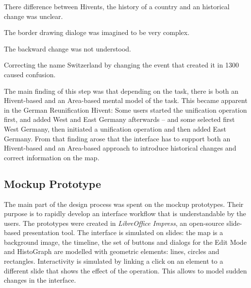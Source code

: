 \begin{compactenum}
  \item There difference between Hivents, the history of a country and an historical change was unclear.
  \item The border drawing dialoge was imagined to be very complex.
  \item The backward change was not understood.
  \item Correcting the name Switzerland by changing the event that created it in 1300 caused confusion.
\end{compactenum}

The main finding of this step was that depending on the task, there is both an Hivent-based and an Area-based mental model of the task. This became apparent in the German Reunification Hivent: Some users started the unification operation first, and added West and East Germany afterwards -- and some selected first West Germany, then initiated a unification operation and then added East Germany. From that finding arose that the interface has to support both an Hivent-based and an Area-based approach to introduce historical changes and correct information on the map.


\subsection{Mockup Prototype} %
\label{sub:mockup_prototype}

The main part of the design process was spent on the mockup prototypes. Their purpose is to rapidly develop an interface workflow that is understandable by the users. The prototypes were created in \emph{LibreOffice Impress}, an open-source slide-based presentation tool. The interface is simulated on slides: the map is a background image, the timeline, the set of buttons and dialogs for the Edit Mode and HistoGraph are modelled with geometric elements: lines, circles and rectangles. Interactivity is simulated by linking a click on an element to a different slide that shows the effect of the operation. This allows to model sudden changes in the interface.

